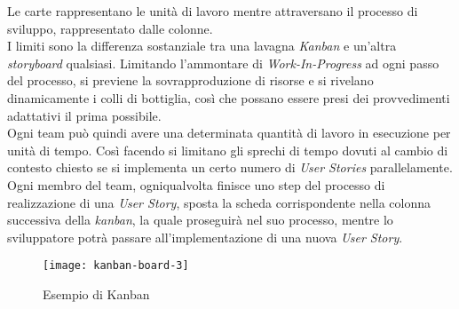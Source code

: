 Le carte rappresentano le unità di lavoro mentre attraversano il processo di sviluppo, rappresentato dalle colonne.\\
I limiti sono la differenza sostanziale tra una lavagna \emph{Kanban} e un’altra \emph{storyboard} qualsiasi. Limitando l’ammontare di \emph{Work-In-Progress} ad ogni passo del processo, si previene la sovrapproduzione di risorse e si rivelano dinamicamente i colli di bottiglia, così che possano essere presi dei provvedimenti adattativi il prima possibile.\\
Ogni team può quindi avere una determinata quantità di lavoro in esecuzione per unità di tempo. Così facendo si limitano gli sprechi di tempo dovuti al cambio di contesto chiesto se si implementa un certo numero di \emph{User Stories} parallelamente. Ogni membro del team, ogniqualvolta finisce uno step del processo di realizzazione di una \emph{User Story}, sposta la scheda corrispondente nella colonna successiva della \emph{kanban}, la quale proseguirà nel suo processo, mentre lo sviluppatore potrà passare all’implementazione di una nuova \emph{User Story}.

\begin{figure}[!ht] 
    \centering 
    \texttt{[image: kanban-board-3]} 
    \caption{Esempio di Kanban}
\end{figure}

